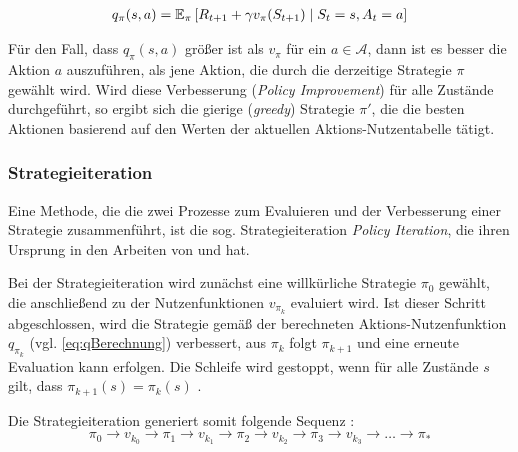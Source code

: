\begin{equation}\label{eq:qBerechnung}
    \begin{aligned}
        q_\pi(s,a) = \operatorname{\mathbb{E}}_\pi\left[ R_{t+1} + \gamma v_\pi(S_{t+1}) \mid S_t = s, A_t=a\right]
    \end{aligned}
\end{equation}

Für den Fall, dass $q_\pi(s,a)$ größer ist als $v_\pi$ für ein $a \in \mathcal{A}$, dann ist es besser die Aktion $a$ auszuführen, als jene Aktion, die durch die derzeitige Strategie $\pi$ gewählt wird. Wird diese Verbesserung (\textit{Policy Improvement}) für alle Zustände durchgeführt, so ergibt sich die gierige (\textit{greedy}) Strategie $\pi'$, die die besten Aktionen basierend auf den Werten der aktuellen Aktions-Nutzentabelle tätigt.

\subsubsection{Strategieiteration}
Eine Methode, die die zwei Prozesse zum Evaluieren und der Verbesserung einer Strategie zusammenführt, ist die sog. Strategieiteration \textit{Policy Iteration}, die ihren Ursprung in den Arbeiten von \cite{bellman1957dynamic} und \cite{howard1960dynamic} hat. 
\par 
Bei der Strategieiteration wird zunächst eine willkürliche Strategie $\pi_0$ gewählt, die anschließend zu der Nutzenfunktionen $v_{\pi_k}$ evaluiert wird. Ist dieser Schritt abgeschlossen, wird die Strategie gemäß der berechneten Aktions-Nutzenfunktion $q_{\pi_k}$ (vgl. \ref{eq:qBerechnung}) verbessert, aus $\pi_k$ folgt $\pi_{k+1}$ und eine erneute Evaluation kann erfolgen. Die Schleife wird gestoppt, wenn für alle Zustände $s$ gilt, dass $\pi_{k+1}(s) = \pi_k(s)$ \cite[S.~22]{Wiering}. 
\par 
Die Strategieiteration generiert somit folgende Sequenz \cite[S.~22]{Wiering}:
\begin{equation}\label{eq:policyItSeq}
\pi_0 \rightarrow v_{k_0} \rightarrow  \pi_1 \rightarrow v_{k_1} \rightarrow  \pi_2 \rightarrow v_{k_2}\rightarrow  \pi_3 \rightarrow v_{k_3}\rightarrow \dots \rightarrow \pi_*
\end{equation}

